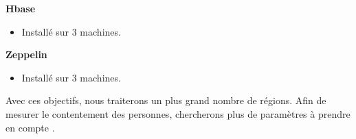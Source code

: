 \documentclass[a4paper,oneside,10pt]{article}
\begin{document}
\textbf{Hbase}
\begin{itemize}
	\item Installé sur 3 machines. 
\end{itemize}
	
\textbf{Zeppelin}
\begin{itemize}
	\item Installé sur 3 machines. 
\end{itemize}


Avec ces objectifs, nous traiterons un plus grand nombre de régions. 
Afin de mesurer le contentement des personnes, chercherons plus de paramètres à prendre en compte . 
\end{document}
